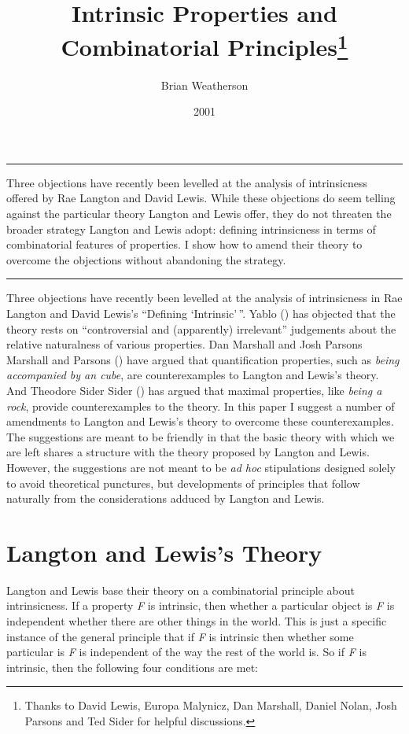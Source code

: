 \documentclass[
  10pt,
  letterpaper,
  DIV=11,
  numbers=noendperiod,
  twoside]{scrartcl}
\title{Intrinsic Properties and Combinatorial Principles\thanks{Thanks
to David Lewis, Europa Malynicz, Dan Marshall, Daniel Nolan, Josh
Parsons and Ted Sider for helpful discussions.}}
\author{Brian Weatherson}
\date{2001}
\renewenvironment{abstract}
 {\vspace{-1.25cm}
 \quotation\small\noindent\rule{\linewidth}{.5pt}\par\smallskip
 \noindent }
 {\par\noindent\rule{\linewidth}{.5pt}\endquotation}
\begin{document}
\maketitle
\begin{abstract}
Three objections have recently been levelled at the analysis of
intrinsicness offered by Rae Langton and David Lewis. While these
objections do seem telling against the particular theory Langton and
Lewis offer, they do not threaten the broader strategy Langton and Lewis
adopt: defining intrinsicness in terms of combinatorial features of
properties. I show how to amend their theory to overcome the objections
without abandoning the strategy.
\end{abstract}


Three objections have recently been levelled at the analysis of
intrinsicness in Rae Langton and David Lewis's ``Defining
`Intrinsic'\,''. Yablo () has objected
that the theory rests on ``controversial and (apparently) irrelevant''
judgements about the relative naturalness of various properties. Dan
Marshall and Josh Parsons Marshall and Parsons
() have argued that quantification
properties, such as \emph{being accompanied by an cube}, are
counterexamples to Langton and Lewis's theory. And Theodore Sider Sider
() has argued that maximal properties,
like \emph{being a rock}, provide counterexamples to the theory. In this
paper I suggest a number of amendments to Langton and Lewis's theory to
overcome these counterexamples. The suggestions are meant to be friendly
in that the basic theory with which we are left shares a structure with
the theory proposed by Langton and Lewis. However, the suggestions are
not meant to be \emph{ad hoc} stipulations designed solely to avoid
theoretical punctures, but developments of principles that follow
naturally from the considerations adduced by Langton and Lewis.

\section{Langton and Lewis's Theory}\label{langton-and-lewiss-theory}

Langton and Lewis base their theory on a combinatorial principle about
intrinsicness. If a property \emph{F} is intrinsic, then whether a
particular object is \emph{F} is independent whether there are other
things in the world. This is just a specific instance of the general
principle that if \emph{F} is intrinsic then whether some particular is
\emph{F} is independent of the way the rest of the world is. So if
\emph{F} is intrinsic, then the following four conditions are met:
\end{document}
